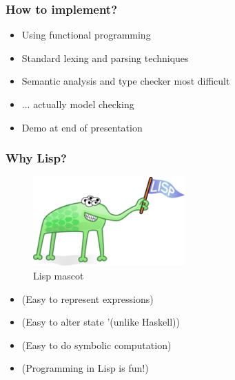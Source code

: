 \documentclass{beamer}
\begin{document}
\begin{frame}
  \frametitle{How to implement?}
  \begin{itemize}
  \item Using functional programming
  \item Standard lexing and parsing techniques
  \item Semantic analysis and type checker most difficult
  \item ... actually model checking
  \item Demo at end of presentation
  \end{itemize}
\end{frame}

\begin{frame}
  \frametitle{Why Lisp?}
  \begin{figure}
    \centering
    \includegraphics[scale=0.45]{lisp.png}
    \caption{Lisp mascot}
    \label{fig:enter-label}
  \end{figure}
  
  \begin{itemize}
  \item (Easy to represent expressions)
  \item (Easy to alter state '(unlike Haskell))
  \item (Easy to do symbolic computation)
  \item (Programming in Lisp is fun!)
  \end{itemize}
\end{frame}

\end{document}
